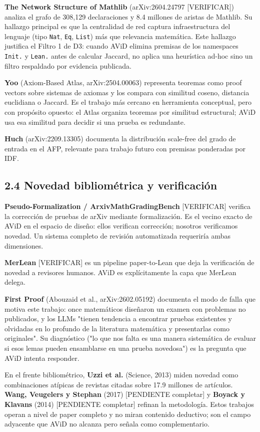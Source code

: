 \documentclass[12pt,a4paper]{article}
\theoremstyle{remark}
\begin{document}
\textbf{The Network Structure of Mathlib} (arXiv:2604.24797 [VERIFICAR]) analiza el grafo de 308,129 declaraciones y 8.4 millones de aristas de Mathlib. Su hallazgo principal es que la centralidad de red captura infraestructura del lenguaje (tipo \texttt{Nat}, \texttt{Eq}, \texttt{List}) más que relevancia matemática. Este hallazgo justifica el Filtro 1 de D3: cuando AViD elimina premisas de los namespaces \texttt{Init.} y \texttt{Lean.} antes de calcular Jaccard, no aplica una heurística ad-hoc sino un filtro respaldado por evidencia publicada.


\textbf{Yoo} (Axiom-Based Atlas, arXiv:2504.00063) representa teoremas como proof vectors sobre sistemas de axiomas y los compara con similitud coseno, distancia euclidiana o Jaccard. Es el trabajo más cercano en herramienta conceptual, pero con propósito opuesto: el Atlas organiza teoremas por similitud estructural; AViD usa esa similitud para decidir si una prueba es redundante.


\textbf{Huch} (arXiv:2209.13305) documenta la distribución scale-free del grado de entrada en el AFP, relevante para trabajo futuro con premisas ponderadas por IDF.


\subsection{2.4 Novedad bibliométrica y verificación}

\textbf{Pseudo-Formalization / ArxivMathGradingBench} [VERIFICAR] verifica la corrección de pruebas de arXiv mediante formalización. Es el vecino exacto de AViD en el espacio de diseño: ellos verifican corrección; nosotros verificamos novedad. Un sistema completo de revisión automatizada requeriría ambas dimensiones.


\textbf{MerLean} [VERIFICAR] es un pipeline paper-to-Lean que deja la verificación de novedad a revisores humanos. AViD es explícitamente la capa que MerLean delega.


\textbf{First Proof} (Abouzaid et al., arXiv:2602.05192) documenta el modo de falla que motiva este trabajo: once matemáticos diseñaron un examen con problemas no publicados, y los LLMs "tienen tendencia a encontrar pruebas existentes y olvidadas en lo profundo de la literatura matemática y presentarlas como originales". Su diagnóstico ("lo que nos falta es una manera sistemática de evaluar si esos lemas pueden ensamblarse en una prueba novedosa") es la pregunta que AViD intenta responder.


En el frente bibliométrico, \textbf{Uzzi et al.} (Science, 2013) miden novedad como combinaciones atípicas de revistas citadas sobre 17.9 millones de artículos. \textbf{Wang, Veugelers y Stephan} (2017) [PENDIENTE completar] y \textbf{Boyack y Klavans} (2014) [PENDIENTE completar] refinan la metodología. Estos trabajos operan a nivel de paper completo y no miran contenido deductivo; son el campo adyacente que AViD no alcanza pero señala como complementario.
\end{document}
